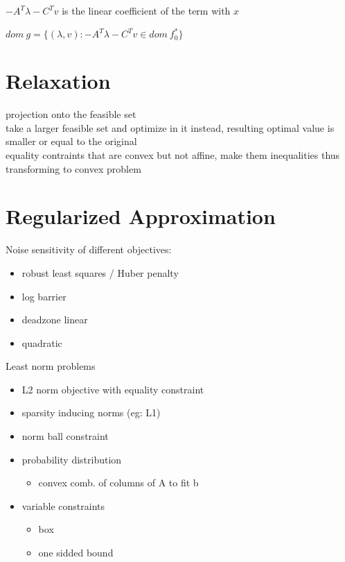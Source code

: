 \documentclass[8pt]{extarticle}
\begin{document}
\begin{multicols*}{2}
  $-A^T\lambda - C^Tv$ is the linear coefficient of the term with $x$
  
  $dom\ g = \{ (\lambda, v): -A^T\lambda - C^Tv \in dom\ f_0^* \}$
  
  \vfill\null
  \columnbreak
  
  \section{Relaxation}

  projection onto the feasible set\\

  take a larger feasible set and optimize in it instead, resulting optimal value is smaller or equal to the original\\

  equality contraints that are convex but not affine, make them inequalities thus transforming to convex problem
  
  \vfill\null
  
  \pagebreak

  \section{Regularized Approximation}

  Noise sensitivity of different objectives:
  \begin{itemize}
  \item robust least squares / Huber penalty
  \item log barrier
  \item deadzone linear
  \item quadratic
  \end{itemize}

  Least norm problems
  \begin{itemize}
  \item L2 norm objective with equality constraint
  \item sparsity inducing norms (eg: L1)
  \item norm ball constraint
  \item probability distribution
    \begin{itemize}
    \item convex comb. of columns of A to fit b
    \end{itemize}
  \item variable constraints
    \begin{itemize}
    \item box
    \item one sidded bound
    \end{itemize}
  \end{itemize}


\end{multicols*}
\end{document}
